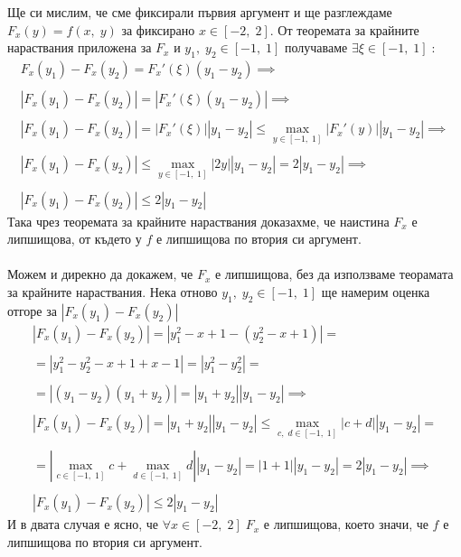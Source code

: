 \documentclass[a4paper, 12pt, oneside]{article}
\begin{document}
Ще си мислим, че сме фиксирали първия аргумент и ще разглеждаме $F_x(y) = f(x, \; y)$
за фиксирано $x \in [-2, \; 2]$. От теоремата за крайните нараствания приложена за $F_x$
и $y_1, \; y_2 \in [-1, \; 1]$ получаваме $\exists \xi \in [-1, \; 1] \; :$ \\
\begin{align*}
    F_x(y_1) - F_x(y_2) = F_x'(\xi)(y_1 - y_2) \implies \\\\
    |F_x(y_1) - F_x(y_2)| = |F_x'(\xi)(y_1 - y_2)| \implies \\\\
    |F_x(y_1) - F_x(y_2)| = |F_x'(\xi)||y_1 - y_2| \leq \displaystyle\max_{y \in [-1, \; 1]}|F_x'(y)||y_1 - y_2| \implies \\\\
    |F_x(y_1) - F_x(y_2)| \leq \displaystyle\max_{y \in [-1, \; 1]}|2y||y_1 - y_2| = 2|y_1 - y_2| \implies \\\\
    |F_x(y_1) - F_x(y_2)| \leq 2|y_1 - y_2|
\end{align*}
Така чрез теоремата за крайните нараствания доказахме, че наистина $F_x$ е липшищова,
от където у $f$ е липшищова по втория си аргумент. \\\\
Можем и дирекно да докажем, че $F_x$ е липшищова, без да използваме теорамата за крайните нараствания.
Нека отново $y_1, \; y_2 \in [-1, \; 1]$ ще намерим оценка отгоре за $|F_x(y_1) - F_x(y_2)|$
\begin{align*}
    |F_x(y_1) - F_x(y_2)| = |y_1^2 - x + 1 - (y_2^2 - x + 1)| = \\\\
    = |y_1^2 - y_2^2 -x + 1 + x - 1| = |y_1^2 - y_2^2| = \\\\
    = |(y_1 - y_2)(y_1 + y_2)| = |y_1 + y_2||y_1 - y_2| \implies \\\\
    |F_x(y_1) - F_x(y_2)| = |y_1 + y_2||y_1 - y_2| \leq \displaystyle\max_{c, \; d \in [-1, \; 1]}|c + d||y_1 - y_2| = \\\\
    = |\displaystyle\max_{c \in [-1, \; 1]} c + \displaystyle\max_{d \in [-1, \; 1]} d||y_1 - y_2| = |1 + 1||y_1 - y_2| = 2|y_1 - y_2| \implies \\\\
    |F_x(y_1) - F_x(y_2)| \leq 2|y_1 - y_2|
\end{align*}
И в двата случая е ясно, че $\forall x \in [-2, \; 2] \; F_x$ е липшищова, което значи, че $f$ е липшищова по втория си аргумент. \\
\end{document}

